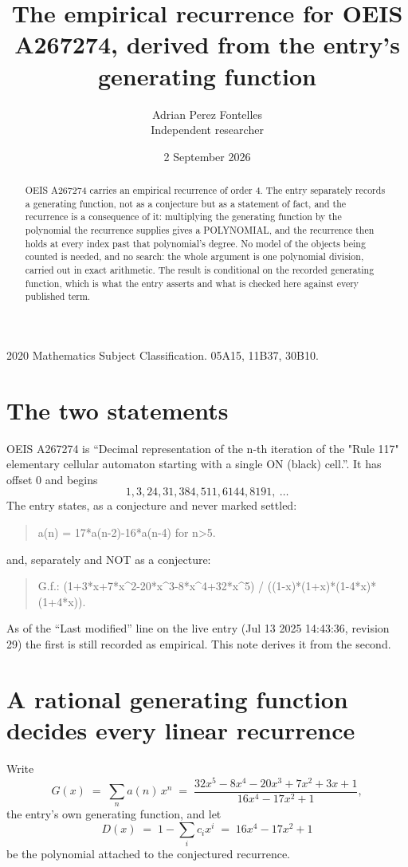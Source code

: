 \documentclass[11pt,a4paper]{article}
\title{The empirical recurrence for OEIS A267274, derived from the entry's generating function}
\author{Adrian Perez Fontelles\\ \small Independent researcher}
\date{2 September 2026}
\theoremstyle{plain}
\theoremstyle{definition}
\begin{document}
\maketitle

\begin{abstract}
OEIS A267274 carries an empirical recurrence of order $4$. The entry separately records a
generating function, not as a conjecture but as a statement of fact, and the recurrence is a
consequence of it: multiplying the generating function by the polynomial the recurrence
supplies gives a POLYNOMIAL, and the recurrence then holds at every index past that
polynomial's degree. No model of the objects being counted is needed, and no search: the
whole argument is one polynomial division, carried out in exact arithmetic. The result is
conditional on the recorded generating function, which is what the entry asserts and what is
checked here against every published term.
\end{abstract}

\noindent\small 2020 Mathematics Subject Classification. 05A15, 11B37, 30B10.\normalsize

\section{The two statements}

OEIS A267274 is ``Decimal representation of the n-th iteration of the "Rule 117" elementary cellular automaton starting with a single ON (black) cell.''. It has offset $0$ and begins
\[
1, 3, 24, 31, 384, 511, 6144, 8191,\ \dots
\]
The entry states, as a conjecture and never marked settled:
\begin{quote}
a(n) = 17*a(n-2)-16*a(n-4) for n>5.
\end{quote}
and, separately and NOT as a conjecture:
\begin{quote}
G.f.: (1+3*x+7*x\^{}2-20*x\^{}3-8*x\^{}4+32*x\^{}5) / ((1-x)*(1+x)*(1-4*x)*(1+4*x)).
\end{quote}
As of the ``Last modified'' line on the live entry (Jul 13 2025 14:43:36, revision 29) the first is still
recorded as empirical. This note derives it from the second.

\section{A rational generating function decides every linear recurrence}

Write
\[
G(x)\;=\;\sum_{n}a(n)\,x^{n}\;=\;\frac{32 x^{5} - 8 x^{4} - 20 x^{3} + 7 x^{2} + 3 x + 1}{16 x^{4} - 17 x^{2} + 1},
\]
the entry's own generating function, and let
\[
D(x)\;=\;1-\sum_i c_i x^{i}\;=\;16 x^{4} - 17 x^{2} + 1
\]
be the polynomial attached to the conjectured recurrence.
\end{document}
